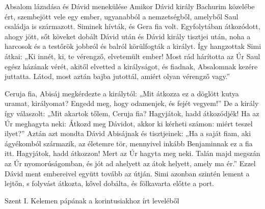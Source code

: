 \documentclass[twoside]{article}
\begin{document}
\begin{lectio}{Absalom lázadása és Dávid menekülése}
Amikor Dávid király Bachurim közelébe ért, szembejött vele egy ember, ugyanabból a nemzetségből, amelyből Saul családja is származott. Siminek hívták, és Gera fia volt. Egyfolytában átkozódott, ahogy jött, sőt köveket dobált Dávid után és Dávid király tisztjei után, noha a harcosok és a testőrök jobbról és balról körülfogták a királyt. Így hangzottak Simi átkai: „Ki innét, ki, te vérengző, elvetemült ember! Most rád hárította az Úr Saul egész házának vérét, akitől elvetted a királyságot, és fiadnak, Absalomnak kezére juttatta. Látod, most aztán bajba jutottál, amiért olyan vérengző vagy.”

Ceruja fia, Abisáj megkérdezte a királytól: „Mit átkozza ez a döglött kutya uramat, királyomat? Engedd meg, hogy odamenjek, és fejét vegyem!” De a király így válaszolt: „Mit akartok tőlem, Ceruja fia? Hagyjátok, hadd átkozódjék! Ha az Úr meghagyta neki: Átkozd meg Dávidot, akkor ki kérheti számon: miért teszel ilyet?” Aztán azt mondta Dávid Abisájnak és tisztjeinek: „Ha a saját fiam, aki ágyékomból származik, az életemre tör, mennyivel inkább Benjaminnak ez a fia itt. Hagyjátok, hadd átkozzon! Mert az Úr hagyta meg neki. Talán majd megszán az Úr nyomorúságomban, és jót ad ahelyett az átok helyett, amely ma ér.” Ezzel Dávid ment embereivel együtt tovább az útján. Simi azonban szintén lement a lejtőn, s folyvást átkozta, kővel dobálta, és fölkavarta előtte a port.
\end{lectio}



Szent I. Kelemen pápának a korintusiakhoz írt leveléből

{\centering{}}
\end{document}

